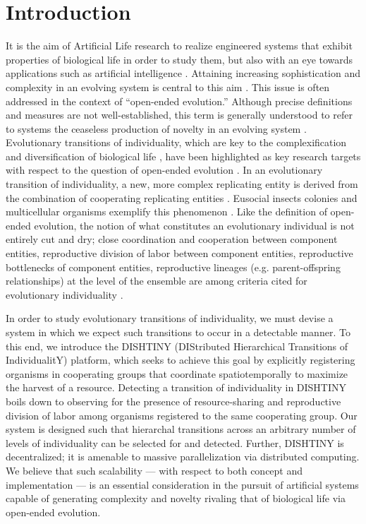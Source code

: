 \section{Introduction}

It is the aim of Artificial Life research to realize engineered systems that exhibit properties of biological life in order to study them, but also with an eye towards applications such as artificial intelligence \citep{bedau2003artificial}.
Attaining increasing sophistication and complexity in an evolving system is central to this aim \citep{goldsby2017increasing}.
This issue is often addressed in the context of ``open-ended evolution.''
Although precise definitions and measures are not well-established, this term is generally understood to refer to systems the ceaseless production of novelty in an evolving system \citep{taylor2016open}.
Evolutionary transitions of individuality, which are key to the complexification and diversification of biological life \citep{smith1997major}, have been highlighted as key research targets with respect to the question of open-ended evolution \citep{ray1996evolving, banzhaf2016defining}.
In an evolutionary transition of individuality, a new, more complex replicating entity is derived from the combination of cooperating replicating entities \citep{west2015major}.
Eusocial insects colonies and multicellular organisms exemplify this phenomenon \cite{smith1997major}.
Like the definition of open-ended evolution, the notion of what constitutes an evolutionary individual is not entirely cut and dry; close coordination and cooperation between component entities, reproductive division of labor between component entities, reproductive bottlenecks of component entities, reproductive lineages (e.g. parent-offspring relationships) at the level of the ensemble are among criteria cited for evolutionary individuality
\citep{ereshefsky2015rethinking, bouchard2013symbiotic}.

In order to study evolutionary transitions of individuality, we must devise a system in which we expect such transitions to occur in a detectable manner.
To this end, we introduce the DISHTINY (DIStributed Hierarchical Transitions of IndividualitY) platform, which seeks to achieve this goal by explicitly registering organisms in cooperating groups that coordinate spatiotemporally to maximize the harvest of a resource.
Detecting a transition of individuality in DISHTINY boils down to observing for the presence of resource-sharing and reproductive division of labor among organisms registered to the same cooperating group.
Our system is designed such that hierarchal transitions across an arbitrary number of levels of individuality can be selected for and detected.
Further, DISHTINY is decentralized; it is amenable to massive parallelization via distributed computing.
We believe that such scalability --- with respect to both concept and implementation --- is an essential consideration in the pursuit of artificial systems capable of generating complexity and novelty rivaling that of biological life via open-ended evolution.

